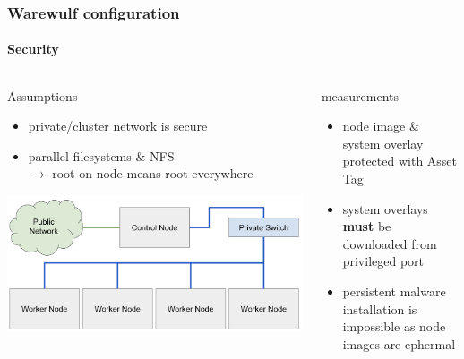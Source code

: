 \documentclass[aspectratio=169]{beamer}
\begin{document}
\begin{frame}[fragile]
\frametitle{Warewulf configuration}
\framesubtitle{Security}
\begin{columns}
\begin{block}{Assumptions}
  \begin{itemize}
    \item private/cluster network is secure
    \item parallel filesystems \& NFS \\
    $\rightarrow$ root on node means root everywhere
  \end{itemize}
  \includegraphics[width=\linewidth]{beowulf_architecture}
\end{block}
\begin{block}{measurements}
  \begin{itemize}
    \item node image \& system overlay protected with Asset Tag 
    \item system overlays \textbf{must} be downloaded from privileged port
    \item persistent malware installation is impossible as node images are ephermal
  \end{itemize}
\end{block}
\end{columns}
\end{frame}
\end{document}
